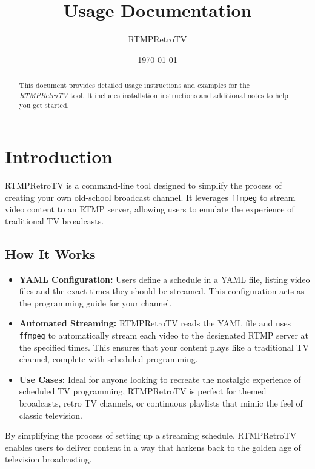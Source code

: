 \documentclass{article}
\title{Usage Documentation}
\author{RTMPRetroTV}
\date{\today}
\begin{document}
	
	\maketitle
	
	\begin{abstract}
		This document provides detailed usage instructions and examples for the \emph{RTMPRetroTV} tool. It includes installation instructions and additional notes to help you get started.
	\end{abstract}
	
	\tableofcontents
	
	\section{Introduction}
	RTMPRetroTV is a command-line tool designed to simplify the process of creating your own old-school broadcast channel. It leverages \texttt{ffmpeg} to stream video content to an RTMP server, allowing users to emulate the experience of traditional TV broadcasts.

	\subsection{How It Works}

	\begin{itemize}
		\item \textbf{YAML Configuration:} Users define a schedule in a YAML file, listing video files and the exact times they should be streamed. This configuration acts as the programming guide for your channel.
	
		\item \textbf{Automated Streaming:} RTMPRetroTV reads the YAML file and uses \texttt{ffmpeg} to automatically stream each video to the designated RTMP server at the specified times. This ensures that your content plays like a traditional TV channel, complete with scheduled programming.
	
		\item \textbf{Use Cases:} Ideal for anyone looking to recreate the nostalgic experience of scheduled TV programming, RTMPRetroTV is perfect for themed broadcasts, retro TV channels, or continuous playlists that mimic the feel of classic television.
	\end{itemize}

	By simplifying the process of setting up a streaming schedule, RTMPRetroTV enables users to deliver content in a way that harkens back to the golden age of television broadcasting.
\end{document}

